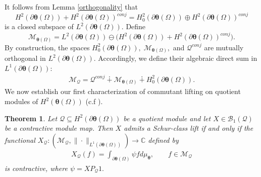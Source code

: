 \documentclass[12pt,reqno]{amsart}
\newtheorem{theorem}{Theorem}[section]
\theoremstyle{remark}
\theoremstyle{definition}
\newcommand{\beq}{\begin{eqnarray}}
\newcommand{\eeq}{\end{eqnarray}}
\begin{document}
It follows from Lemma \ref{orthogonality} that 
 $$ H^2(\partial\boldsymbol\theta(\Omega)) + H^2(\partial\boldsymbol\theta(\Omega))^{conj} = H_0^2(\partial\boldsymbol\theta(\Omega)) \oplus H^2(\partial\boldsymbol\theta(\Omega))^{conj}$$ is a closed subspace of $L^2(\partial\boldsymbol\theta(\Omega))$. 
Define $$\mathcal M_{\boldsymbol\theta(\Omega)} = L^2(\partial\boldsymbol\theta(\Omega)) \ominus \big( H^2(\partial\boldsymbol\theta(\Omega)) + H^2(\partial\boldsymbol\theta(\Omega))^{conj} \big).$$
By construction, the spaces $H^2_0(\partial\boldsymbol\theta(\Omega)),\;\mathcal M_{\boldsymbol\theta(\Omega)},$ and $\mathcal{Q}^{conj}$ are mutually orthogonal in $L^2(\partial\boldsymbol\theta(\Omega)).$ 
Accordingly, we define their algebraic direct sum in $L^1(\partial\boldsymbol\theta(\Omega))$: 
\beq \label{eq 14} \mathcal M_{\mathcal Q} =\mathcal Q^{conj} \dotplus \mathcal M_{\boldsymbol\theta(\Omega)} \dotplus H_0^2(\partial\boldsymbol\theta(\Omega)).\eeq 
We now establish our first characterization of commutant lifting on quotient modules of $H^2(\boldsymbol\theta(\Omega))$ (c.f \cite[Theorem 4.1]{DeS2026}).
\begin{theorem}\label{1st characterization}
    Let $\mathcal{Q}\subseteq  H^2(\partial\boldsymbol\theta(\Omega))$ be a quotient module and let $X\in \mathcal{B}_1(\mathcal{Q})$ be a contractive module map. Then $X$ admits a Schur-class lift if and only if the functional $X_{\mathcal{Q}}: \left(\mathcal{M}_{\mathcal{Q}}, \|\cdot\|_{L^1({\partial\boldsymbol\theta(\Omega)})}\right) \to \mathbb C$ defined by \beq \label{eq 11} X_{\mathcal{Q}}(f)=\int_{\partial\boldsymbol\theta(\Omega)}\psi f d\mu_{\boldsymbol\theta},\qquad f\in \mathcal{M}_{\mathcal{Q}}\eeq is contractive, where $\psi=XP_{\mathcal{Q}}1.$
\end{theorem}
\end{document}
